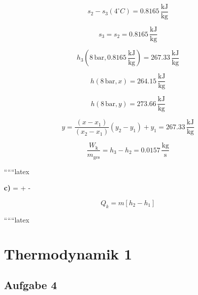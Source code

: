\[
s_2 - s_3 (4^\circ C) = 0.8165 \, \frac{\text{kJ}}{\text{kg}}
\]

\[
s_3 = s_2 = 0.8165 \, \frac{\text{kJ}}{\text{kg}}
\]

\[
h_3 (8 \, \text{bar}, 0.8165 \, \frac{\text{kJ}}{\text{kg}}) = 267.33 \, \frac{\text{kJ}}{\text{kg}}
\]

\[
h (8 \, \text{bar}, x) = 264.15 \, \frac{\text{kJ}}{\text{kg}}
\]

\[
h (8 \, \text{bar}, y) = 273.66 \, \frac{\text{kJ}}{\text{kg}}
\]

\[
y = \frac{(x - x_1)}{(x_2 - x_1)} (y_2 - y_1) + y_1 = 267.33 \, \frac{\text{kJ}}{\text{kg}}
\]

\[
\frac{W_{\text{k}}}{m_{\text{ges}}} = h_3 - h_2 = 0.0157 \, \frac{\text{kg}}{\text{s}}
\]

``````latex


\textbf{c)} \quad {} = \sum {}  + \sum {} - \sum {}

\[
Q_k = m \left[ h_2 - h_1 \right]
\]

``````latex


\section*{Thermodynamik 1}

\subsection*{Aufgabe 4}

